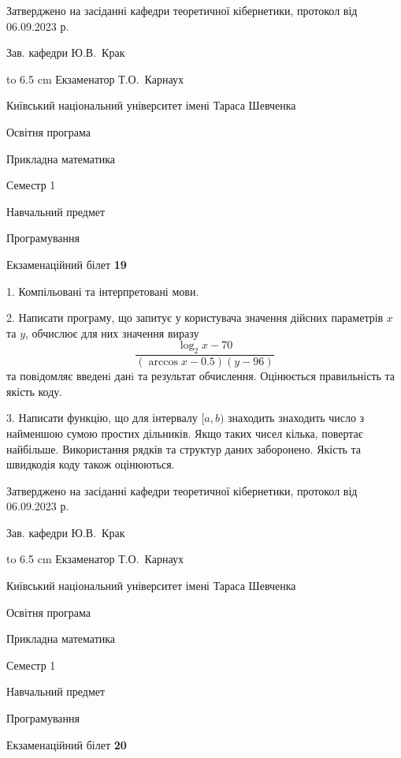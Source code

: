 \documentclass[12pt, ukrainian]{article}
\begin{document}
{\smallskip\smallskip \begin {scriptsize} Затверджено на засіданні кафедри теоретичної кібернетики, протокол   від   06.09.2023 р.\par\smallskip\smallskip\smallskip\smallskip
{\parbox {6.5 cm} {Зав. кафедри \dotfill Ю.В.~Крак}}\hspace {0.7cm} {\hbox to 6.5 cm { Екзаменатор \dotfill Т.О.~Карнаух}} \end{scriptsize}}
\newpage
{{\begin {scriptsize}\par
{ \center  Київський національний університет імені Тараса Шевченка \par}
{\parbox {5 cm}{Освітня програма \hfill}{\parbox {7 cm}{Прикладна математика\hfill}}\parbox {6 cm}{\hfill Семестр 1}}\par
{\parbox {5 cm} {Навчальний предмет \hfill}\parbox {7 cm}{Програмування \hfill}\parbox {6cm}{\hfill}\par}\vspace{-15pt} \end{scriptsize}}{\center Екзаменаційний білет \No \textbf { 19 }\par}}
{%
1. Компільовані та інтерпретовані мови.%
\par
2. Написати програму, що запитує у користувача значення дійсних параметрів $x$ та $y$, обчислює для них значення виразу 
$$\frac{\log_{2} x - 70}{(\arccos x - 0.5) (y - 96)}$$ 
та повiдомляє введенi данi та результат обчислення.
 Оцінюється правильність та якість коду.

\par
3. Написати функцію, що для інтервалу $[a, b)$ знаходить знаходить число з найменшою сумою простих дільників. Якщо таких чисел кілька, повертає найбільше.  Використання рядків та структур даних заборонено. Якість та швидкодія коду також оцінюються. 

}
{\smallskip\smallskip \begin {scriptsize} Затверджено на засіданні кафедри теоретичної кібернетики, протокол   від   06.09.2023 р.\par\smallskip\smallskip\smallskip\smallskip
{\parbox {6.5 cm} {Зав. кафедри \dotfill Ю.В.~Крак}}\hspace {0.7cm} {\hbox to 6.5 cm { Екзаменатор \dotfill Т.О.~Карнаух}} \end{scriptsize}}
\vspace{0.9cm}
{{\begin {scriptsize}\par
{ \center  Київський національний університет імені Тараса Шевченка \par}
{\parbox {5 cm}{Освітня програма \hfill}{\parbox {7 cm}{Прикладна математика\hfill}}\parbox {6 cm}{\hfill Семестр 1}}\par
{\parbox {5 cm} {Навчальний предмет \hfill}\parbox {7 cm}{Програмування \hfill}\parbox {6cm}{\hfill}\par}\vspace{-15pt} \end{scriptsize}}{\center Екзаменаційний білет \No \textbf { 20 }\par}}
\end{document}
